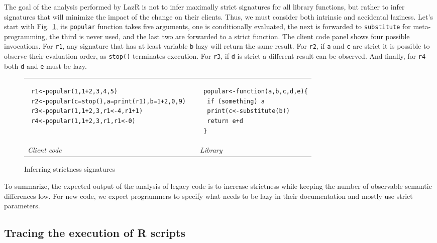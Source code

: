 \documentclass[review,nonacm,screen,acmsmall,anonymous=true]{acmart}
\renewcommand{\c}[1]{\lstinline |#1|\xspace}
\newcommand{\lazr}{{\sf LazR}\xspace}
\begin{document}
The goal of the analysis performed by \lazr is not to infer maximally strict
signatures for all library functions, but rather to infer signatures that will
minimize the impact of the change on their clients. Thus, we must consider both
intrinsic and accidental laziness. Let's start with Fig.~\ref{iss}, its
\c{popular} function takes five arguments, one is conditionally evaluated, the
next is forwarded to \c{substitute} for meta-programming, the third is never
used, and the last two are forwarded to a strict function. The client code panel
shows four possible invocations. For \c{r1}, any signature that has at least
variable \c b lazy will return the same result. For \c{r2}, if \c a and \c c are
strict it is possible to observe their evaluation order, as \c{stop()}
terminates execution. For \c{r3}, if \c{d} is strict a different result can be
observed. And finally, for \c{r4} both \c d and \c{e} must be lazy.

\begin{figure}[!h]
\begin{tabular}{lll}
  \begin{minipage}{7cm}
\begin{lstlisting}
 r1<-popular(1,1+2,3,4,5)
 r2<-popular(c=stop(),a=print(r1),b=1+2,0,9)
 r3<-popular(1,1+2,3,r1<-4,r1+1)
 r4<-popular(1,1+2,3,r1,r1<-0)
\end{lstlisting}
\end{minipage}
&&
\begin{minipage}{5cm}
\begin{lstlisting}
 popular<-function(a,b,c,d,e){
  if (something) a
  print(c<-substitute(b))
  return e+d
 }
\end{lstlisting}
\end{minipage}\\
\it Client code&& \it Library
\end{tabular}%
\caption{Inferring strictness signatures}\label{iss}
\end{figure}

To summarize, the expected output of the analysis of legacy code is to increase
strictness while keeping the number of observable semantic differences low. For
new code, we expect programmers to specify what needs to be lazy in their
documentation and mostly use strict parameters.

\subsection{Tracing the execution of R scripts}
\end{document}
